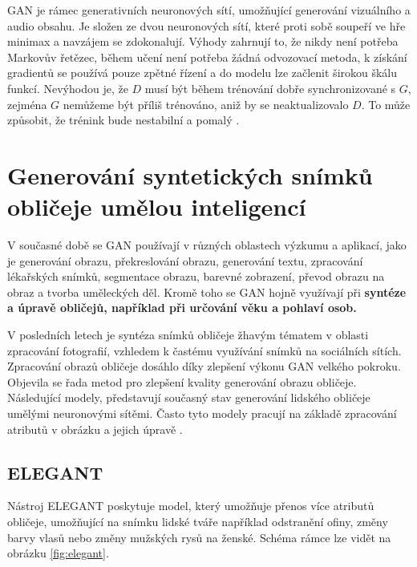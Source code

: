 \bigskip

\noindent GAN je rámec generativních neuronových sítí, umožňující generování vizuálního a audio obsahu. Je složen ze dvou neuronových sítí, které proti sobě soupeří ve hře minimax a navzájem se zdokonalují. Výhody zahrnují to, že nikdy není potřeba Markovův řetězec, během učení není potřeba žádná odvozovací metoda, k získání gradientů se používá pouze zpětné řízení a do modelu lze začlenit širokou škálu funkcí. Nevýhodou je, že $D$ musí být během trénování dobře synchronizované s $G$, zejména $G$ nemůžeme být příliš trénováno, aniž by se neaktualizovalo $D$. To může způsobit, že trénink bude nestabilní a pomalý \cite{goodfellow2014generative}.

\section{Generování syntetických snímků obličeje umělou inteligencí}

V současné době se GAN používají v různých oblastech výzkumu a aplikací, jako je generování obrazu, překreslování obrazu, generování textu, zpracování lékařských snímků, segmentace obrazu, barevné zobrazení, převod obrazu na obraz a tvorba uměleckých děl. Kromě toho se GAN hojně využívají při \bf syntéze a úpravě obličejů\rm, například při určování věku a pohlaví osob. 

V posledních letech je syntéza snímků obličeje žhavým tématem v oblasti zpracování fotografií, vzhledem k častému využívání snímků na sociálních sítích. Zpracování obrazů obličeje dosáhlo díky zlepšení výkonu GAN velkého pokroku. Objevila se řada metod pro zlepšení kvality generování obrazu obličeje. Následující modely, představují současný stav generování lidského obličeje umělými neuronovými sítěmi. Často tyto modely pracují na základě zpracování atributů v obrázku a jejich úpravě \cite{reviewGANs}. 

\newpage

\subsection*{ELEGANT}

Nástroj ELEGANT poskytuje model, který umožňuje přenos více atributů obličeje, umožňující na snímku lidské tváře například odstranění ofiny, změny barvy vlasů nebo změny mužských rysů na ženské. Schéma rámce lze vidět na obrázku \ref{fig:elegant}.

